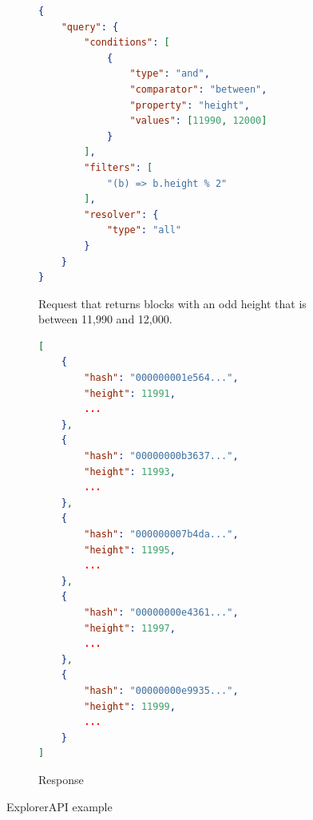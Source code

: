\begin{figure}[h]
    \begin{subfigure}[t]{.5\textwidth}
        \begin{lstlisting}[language=json]
{
    "query": {
        "conditions": [
            {
                "type": "and",
                "comparator": "between",
                "property": "height",
                "values": [11990, 12000]
            }
        ],
        "filters": [
            "(b) => b.height % 2"
        ],
        "resolver": {
            "type": "all"
        }
    }
}
        \end{lstlisting}
        \caption{Request that returns blocks with an odd height that is between 11,990 and 12,000.}
        \label{explorerApiRequest}
    \end{subfigure}
    \begin{subfigure}[t]{.5\textwidth}
        \begin{lstlisting}[language=json]
[
    {
        "hash": "000000001e564...",
        "height": 11991,
        ...
    },
    {
        "hash": "00000000b3637...",
        "height": 11993,
        ...
    },
    {
        "hash": "000000007b4da...",
        "height": 11995,
        ...
    },
    {
        "hash": "00000000e4361...",
        "height": 11997,
        ...
    },
    {
        "hash": "00000000e9935...",
        "height": 11999,
        ...
    }
]
        \end{lstlisting}
        \caption{Response}
        \label{explorerApiResponse}
    \end{subfigure}
    \caption{ExplorerAPI example}
    \label{explorerApiExample}
\end{figure}

 



